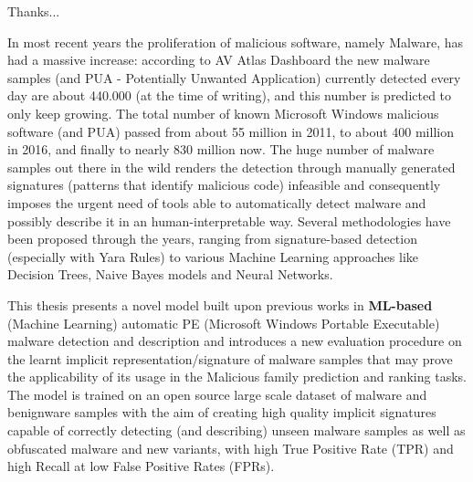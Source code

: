 \documentclass[pdfa%
,cucitura%
]{toptesi}
\begin{document}

%



\frontespizio
\paginavuota
\newpage
\advance\voffset -5mm
\advance\textheight 30mm

\begin{dedica}
	
Thanks...

\end{dedica}

\sommario
In most recent years the proliferation of malicious software, namely Malware, has had a massive increase: according to AV Atlas Dashboard \cite{AvAtlas} the new malware samples (and PUA - Potentially Unwanted Application) currently detected every day are about 440.000 (at the time of writing), and this number is predicted to only keep growing. The total number of known Microsoft Windows malicious software (and PUA) passed from about 55 million in 2011, to about 400 million in 2016, and finally to nearly 830 million now. The huge number of malware samples out there in the wild renders the detection through manually generated signatures (patterns that identify malicious code) infeasible and consequently imposes the urgent need of tools able to automatically detect malware and possibly describe it in an human-interpretable way. Several methodologies have been proposed through the years, ranging from signature-based detection (especially with Yara Rules) to various Machine Learning approaches like Decision Trees, Naive Bayes models and Neural Networks.

This thesis presents a novel model built upon previous works in \textbf{ML-based} (Machine Learning) automatic PE (Microsoft Windows Portable Executable) malware detection and description and introduces a new evaluation procedure on the learnt implicit representation/signature of malware samples that may prove the applicability of its usage in the Malicious family prediction and ranking tasks. The model is trained on an open source large scale dataset of malware and benignware samples with the aim of creating high quality implicit signatures capable of correctly detecting (and describing) unseen malware samples as well as obfuscated malware and new variants, with high True Positive Rate (TPR) and high Recall at low False Positive Rates (FPRs).
\end{document}
